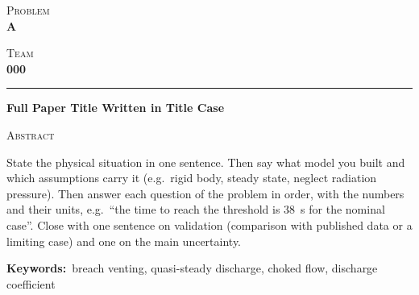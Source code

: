 \documentclass[12pt,letterpaper]{article}
\newcommand{\teamnum}{000}          %
\newcommand{\problemltr}{A}         %
\newcommand{\papertitle}{Full Paper Title Written in Title Case}
\newcommand{\keywords}{breach venting, quasi-steady discharge, choked flow,
  discharge coefficient}
\begin{document}
\begin{titlepage}
\thispagestyle{empty}
\vspace*{0.6cm}
\noindent
\begin{minipage}[t]{0.45\textwidth}
  {\scshape Problem}\\[0.35em]{\LARGE\bfseries \problemltr}
\end{minipage}%
\hfill
\begin{minipage}[t]{0.45\textwidth}
  \raggedleft
  {\scshape Team}\\[0.35em]{\LARGE\bfseries \teamnum}
\end{minipage}

\vspace{1.1em}
\noindent\rule{\linewidth}{0.5pt}
\vspace{1.7em}

\begin{center}
  {\LARGE\bfseries \papertitle}
\end{center}

\vspace{1.7em}
\begin{center}
  {\large\scshape Abstract}
\end{center}

\begingroup
{}
\setlength{\leftskip}{0.05\textwidth}
\setlength{\rightskip}{0.05\textwidth}
\noindent
State the physical situation in one sentence. Then say what model you built
and which assumptions carry it (e.g.\ rigid body, steady state, neglect
radiation pressure). Then answer each question of the problem in order, with
the numbers and their units, e.g.\ ``the time to reach the threshold is
\SI{38}{s} for the nominal case''. Close with one sentence on validation
(comparison with published data or a limiting case) and one on the main
uncertainty.
\par

\vspace{1.0em}
\noindent\textbf{Keywords:}~\keywords\par
\endgroup

\vfill
\end{titlepage}
\setcounter{page}{2}%
\end{document}
